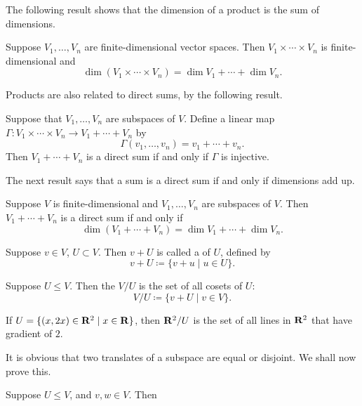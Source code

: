 The following result shows that the dimension of a product is the sum of dimensions.

\begin{proposition}
Suppose $V_1,\dots,V_n$ are finite-dimensional vector spaces. Then $V_1\times\cdots\times V_n$ is finite-dimensional and
\[\dim(V_1\times\cdots\times V_n)=\dim V_1+\cdots+\dim V_n.\]
\end{proposition}

Products are also related to direct sums, by the following result.

\begin{lemma}
Suppose that $V_1,\dots,V_n$ are subspaces of $V$. Define a linear map $\Gamma:V_1\times\cdots\times V_n\to V_1+\cdots+V_n$ by
\[\Gamma(v_1,\dots,v_n)=v_1+\cdots+v_n.\]
Then $V_1+\cdots+V_n$ is a direct sum if and only if $\Gamma$ is injective.
\end{lemma}

The next result says that a sum is a direct sum if and only if dimensions add up.

\begin{proposition}
Suppose $V$ is finite-dimensional and $V_1,\dots,V_n$ are subspaces of $V$. Then $V_1+\cdots+V_n$ is a direct sum if and only if
\[\dim(V_1+\cdots+V_n)=\dim V_1+\cdots+\dim V_n.\]
\end{proposition}

\begin{definition}[Coset]
Suppose $v\in V$, $U\subset V$. Then $v+U$ is called a  of $U$, defined by
\[v+U\coloneqq\{v+u\mid u\in U\}.\]
\end{definition}

\begin{definition}
Suppose $U\le V$. Then the  $V/U$ is the set of all cosets of $U$:
\[V/U\coloneqq\{v+U\mid v\in V\}.\]
\end{definition}

\begin{example}
If $U=\{(x,2x)\in\mathbf R^2\mid x\in\mathbf R\}$, then $\mathbf R^2/U$ is the set of all lines in $\mathbf R^2$ that have gradient of $2$.
\end{example}

It is obvious that two translates of a subspace are equal or disjoint. We shall now prove this.

\begin{proposition}
Suppose $U\le V$, and $v,w\in V$. Then
\end{proposition}

